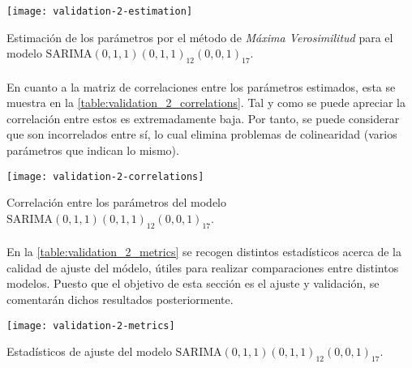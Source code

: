 \documentclass[a4paper, spanish]{article}
\begin{document}
      \begin{table}[htb!]
        \centering
        \texttt{[image: validation-2-estimation]}
        \caption{Estimación de los parámetros por el método de \emph{Máxima Verosimilitud} para el modelo $\text{SARIMA}(0, 1, 1)(0, 1, 1)_{12}(0, 0, 1)_{17}$.}
        \label{table:validation_2_estimation}
      \end{table}

      \paragraph{}
      En cuanto a la matriz de correlaciones entre los parámetros estimados, esta se muestra en la \autoref{table:validation_2_correlations}. Tal y como se puede apreciar la correlación entre estos es extremadamente baja. Por tanto, se puede considerar que son incorrelados entre sí, lo cual elimina problemas de colinearidad (varios parámetros que indican lo mismo).

      \begin{table}[htb!]
        \centering
        \texttt{[image: validation-2-correlations]}
        \caption{Correlación entre los parámetros del modelo $\text{SARIMA}(0, 1, 1)(0, 1, 1)_{12}(0, 0, 1)_{17}$.}
        \label{table:validation_2_correlations}
      \end{table}

      \paragraph{}
      En la \autoref{table:validation_2_metrics} se recogen distintos estadísticos acerca de la calidad de ajuste del módelo, útiles para realizar comparaciones entre distintos modelos. Puesto que el objetivo de esta sección es el ajuste y validación, se comentarán dichos resultados posteriormente.

      \begin{table}[htb!]
        \centering
        \texttt{[image: validation-2-metrics]}
        \caption{Estadísticos de ajuste del modelo $\text{SARIMA}(0, 1, 1)(0, 1, 1)_{12}(0, 0, 1)_{17}$.}
        \label{table:validation_2_metrics}
      \end{table}
\end{document}
